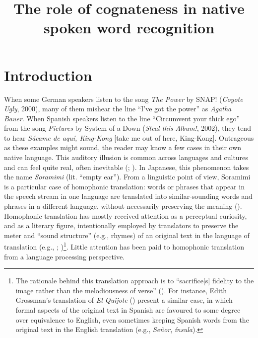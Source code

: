 \documentclass[
  man,
  longtable,
  nolmodern,
  notxfonts,
  notimes,
  colorlinks=true,linkcolor=blue,citecolor=blue,urlcolor=blue]{apa7}
\title{The role of cognateness in native spoken word recognition}
\begin{document}
\maketitle




\setlength\LTleft{0pt}




\section{Introduction}\label{introduction}

When some German speakers listen to the song \emph{The Power} by SNAP!
(\emph{Coyote Ugly}, 2000), many of them mishear the line ``I've got the
power'' as \emph{Agatha Bauer}. When Spanish speakers listen to the line
``Circumvent your thick ego'' from the song \emph{Pictures} by System of
a Down (\emph{Steal this Album!}, 2002), they tend to hear \emph{Sácame
de aquí, King-Kong} {[}take me out of here, King-Kong{]}. Outrageous as
these examples might sound, the reader may know a few cases in their own
native language. This auditory illusion is common across languages and
cultures and can feel quite real, often inevitable
(;
). In
Japanese, this phenomenon takes the name \emph{Soramimi} (lit. ``empty
ear''). From a linguistic point of view, Soramimi is a particular case
of homophonic translation: words or phrases that appear in the speech
stream in one language are translated into similar-sounding words and
phrases in a different language, without necessarily preserving the
meaning (). Homophonic
translation has mostly received attention as a perceptual curiosity, and
as a literary figure, intentionally employed by translators to preserve
the meter and ``sound structure'' (e.g., rhymes) of an original text in
the language of translation (e.g.,
;
)\footnote{The
  rationale behind this translation approach is to ``sacrifice{[}s{]}
  fidelity to the image rather than the melodiousness of verse''
  (). For instance, Edith
  Grossman's translation of \emph{El Quijote}
  () present a
  similar case, in which formal aspects of the original text in Spanish
  are favoured to some degree over equivalence to English, even
  sometimes keeping Spanish words from the original text in the English
  translation (e.g., \emph{Señor}, \emph{ínsula}).}. Little attention
has been paid to homophonic translation from a language processing
perspective.
\end{document}
